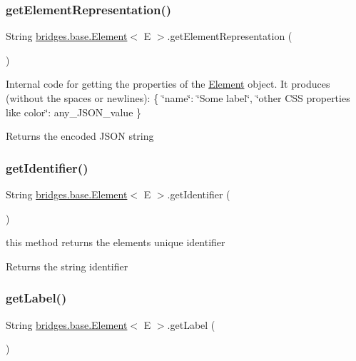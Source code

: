 \subsubsection{\texorpdfstring{get\+Element\+Representation()}{getElementRepresentation()}}
{\footnotesize\ttfamily String \mbox{\hyperlink{classbridges_1_1base_1_1_element}{bridges.\+base.\+Element}}$<$ E $>$.get\+Element\+Representation (\begin{DoxyParamCaption}{ }\end{DoxyParamCaption})}

Internal code for getting the properties of the \mbox{\hyperlink{classbridges_1_1base_1_1_element}{Element}} object. It produces (without the spaces or newlines)\+: \{ \char`\"{}name\char`\"{}\+: \char`\"{}\+Some label\char`\"{}, \char`\"{}other C\+S\+S properties like color\char`\"{}\+: any\+\_\+\+J\+S\+O\+N\+\_\+value \} \begin{DoxyReturn}{Returns}
the encoded J\+S\+ON string 
\end{DoxyReturn}
\mbox{\label{classbridges_1_1base_1_1_element_ad5496f568b4cca3909800eceea5fb47d}} 
\subsubsection{\texorpdfstring{get\+Identifier()}{getIdentifier()}}
{\footnotesize\ttfamily String \mbox{\hyperlink{classbridges_1_1base_1_1_element}{bridges.\+base.\+Element}}$<$ E $>$.get\+Identifier (\begin{DoxyParamCaption}{ }\end{DoxyParamCaption})}

this method returns the element\textquotesingle{}s unique identifier \begin{DoxyReturn}{Returns}
the string identifier 
\end{DoxyReturn}
\mbox{\label{classbridges_1_1base_1_1_element_a5c831a0238de487765f6021a887f1542}} 
\subsubsection{\texorpdfstring{get\+Label()}{getLabel()}}
{\footnotesize\ttfamily String \mbox{\hyperlink{classbridges_1_1base_1_1_element}{bridges.\+base.\+Element}}$<$ E $>$.get\+Label (\begin{DoxyParamCaption}{ }\end{DoxyParamCaption})}

